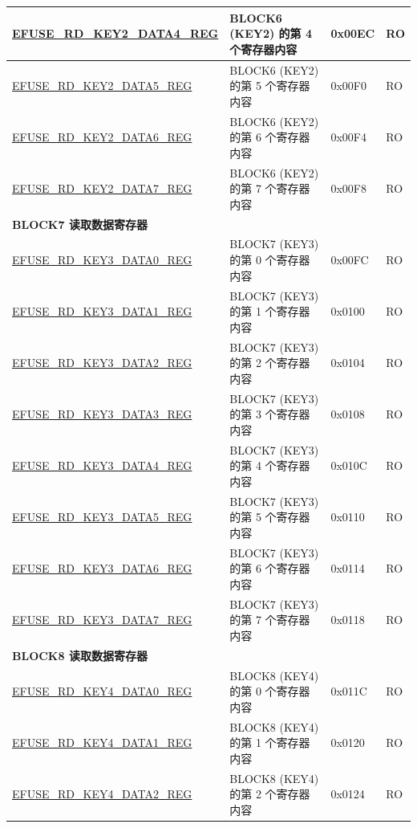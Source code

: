 \begin{longtable}{ | p{7cm} | p{7.2cm} | p{1.3cm} | p{1cm} | }
\hyperref[regdesc:EFUSERDKEY2DATANREG]{EFUSE\_RD\_KEY2\_DATA4\_REG} & BLOCK6 (KEY2) 的第 4 个寄存器内容 & 0x00EC & RO \\ \hline
\hyperref[regdesc:EFUSERDKEY2DATANREG]{EFUSE\_RD\_KEY2\_DATA5\_REG} & BLOCK6 (KEY2) 的第 5 个寄存器内容 & 0x00F0 & RO \\ \hline
\hyperref[regdesc:EFUSERDKEY2DATANREG]{EFUSE\_RD\_KEY2\_DATA6\_REG} & BLOCK6 (KEY2) 的第 6 个寄存器内容 & 0x00F4 & RO \\ \hline
\hyperref[regdesc:EFUSERDKEY2DATANREG]{EFUSE\_RD\_KEY2\_DATA7\_REG} & BLOCK6 (KEY2) 的第 7 个寄存器内容 & 0x00F8 & RO \\ \hline
\multicolumn{4}{|l|}{\textbf{BLOCK7 读取数据寄存器}} \\ \hline
\hyperref[regdesc:EFUSERDKEY3DATAMREG]{EFUSE\_RD\_KEY3\_DATA0\_REG} & BLOCK7 (KEY3) 的第 0 个寄存器内容 & 0x00FC & RO \\ \hline
\hyperref[regdesc:EFUSERDKEY3DATAMREG]{EFUSE\_RD\_KEY3\_DATA1\_REG} & BLOCK7 (KEY3) 的第 1 个寄存器内容 & 0x0100 & RO \\ \hline
\hyperref[regdesc:EFUSERDKEY3DATAMREG]{EFUSE\_RD\_KEY3\_DATA2\_REG} & BLOCK7 (KEY3) 的第 2 个寄存器内容 & 0x0104 & RO \\ \hline
\hyperref[regdesc:EFUSERDKEY3DATAMREG]{EFUSE\_RD\_KEY3\_DATA3\_REG} & BLOCK7 (KEY3) 的第 3 个寄存器内容 & 0x0108 & RO \\ \hline
\hyperref[regdesc:EFUSERDKEY3DATAMREG]{EFUSE\_RD\_KEY3\_DATA4\_REG} & BLOCK7 (KEY3) 的第 4 个寄存器内容 & 0x010C & RO \\ \hline
\hyperref[regdesc:EFUSERDKEY3DATAMREG]{EFUSE\_RD\_KEY3\_DATA5\_REG} & BLOCK7 (KEY3) 的第 5 个寄存器内容 & 0x0110 & RO \\ \hline
\hyperref[regdesc:EFUSERDKEY3DATAMREG]{EFUSE\_RD\_KEY3\_DATA6\_REG} & BLOCK7 (KEY3) 的第 6 个寄存器内容 & 0x0114 & RO \\ \hline
\hyperref[regdesc:EFUSERDKEY3DATAMREG]{EFUSE\_RD\_KEY3\_DATA7\_REG} & BLOCK7 (KEY3) 的第 7 个寄存器内容 & 0x0118 & RO \\ \hline
\multicolumn{4}{|l|}{\textbf{BLOCK8 读取数据寄存器}} \\ \hline
\hyperref[regdesc:EFUSERDKEY4DATANREG]{EFUSE\_RD\_KEY4\_DATA0\_REG} & BLOCK8 (KEY4) 的第 0 个寄存器内容 & 0x011C & RO \\ \hline
\hyperref[regdesc:EFUSERDKEY4DATANREG]{EFUSE\_RD\_KEY4\_DATA1\_REG} & BLOCK8 (KEY4) 的第 1 个寄存器内容 & 0x0120 & RO \\ \hline
\hyperref[regdesc:EFUSERDKEY4DATANREG]{EFUSE\_RD\_KEY4\_DATA2\_REG} & BLOCK8 (KEY4) 的第 2 个寄存器内容 & 0x0124 & RO \\ \hline

\end{longtable}
